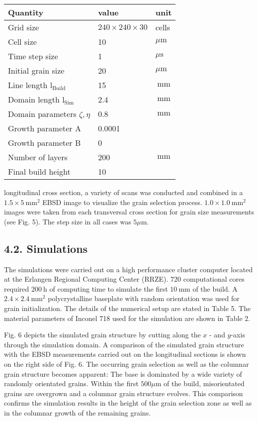\documentclass[10pt]{article}
\begin{document}
\begin{center}
\begin{tabular}{lll}
\hline
Quantity & value & unit \\
\hline
Grid size & $240 \times 240 \times 30$ & cells \\
Cell size & 10 & $\mu \mathrm{m}$ \\
Time step size & 1 & $\mu \mathrm{s}$ \\
Initial grain size & 20 & $\mu \mathrm{m}$ \\
Line length $\mathrm{l}_{\text {Build }}$ & 15 & $\mathrm{~mm}$ \\
Domain length $\mathrm{l}_{\text {Sim }}$ & 2.4 & $\mathrm{~mm}$ \\
Domain parameters $\zeta, \eta$ & 0.8 & $\mathrm{~mm}$ \\
Growth parameter A & 0.0001 &  \\
Growth parameter B & 0 &  \\
Number of layers & 200 & $\mathrm{~mm}$ \\
Final build height & 10 &  \\
\hline
\end{tabular}
\end{center}

longitudinal cross section, a variety of scans was conducted and combined in a $1.5 \times 5 \mathrm{~mm}^{2}$ EBSD image to visualize the grain selection process. $1.0 \times 1.0 \mathrm{~mm}^{2}$ images were taken from each transversal cross section for grain size measurements (see Fig. 5). The step size in all cases was $5 \mu \mathrm{m}$.

\subsection*{4.2. Simulations}
The simulations were carried out on a high performance cluster computer located at the Erlangen Regional Computing Center (RRZE). 720 computational cores required $200 \mathrm{~h}$ of computing time to simulate the first $10 \mathrm{~mm}$ of the build. A $2.4 \times 2.4 \mathrm{~mm}^{2}$ polycrystalline baseplate with random orientation was used for grain initialization. The details of the numerical setup are stated in Table 5. The material parameters of Inconel 718 used for the simulation are shown in Table 2.

Fig. 6 depicts the simulated grain structure by cutting along the $x$ - and $y$-axis through the simulation domain. A comparison of the simulated grain structure with the EBSD measurements carried out on the longitudinal sections is shown on the right side of Fig. 6. The occurring grain selection as well as the columnar grain structure becomes apparent: The base is dominated by a wide variety of randomly orientated grains. Within the first $500 \mu \mathrm{m}$ of the build, misorientated grains are overgrown and a columnar grain structure evolves. This comparison confirms the simulation results in the height of the grain selection zone as well as in the columnar growth of the remaining grains.
\end{document}
